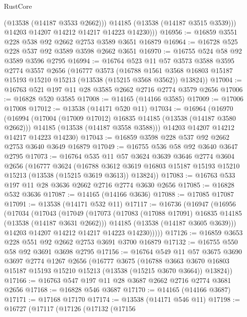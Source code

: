 \begin{lexlean}{RustCore}
\begin{coremodule}
              (@13538 (@14187 @3533 @2662)))
            @14185
            (@13538 (@14187 @3515 @3539)))
          @14203
          @14207
          @14212
          @14217
          @14223
          @14230)))
@16956 := @16859 @3551 @228 @538 @92 @2662 @2753 @3589 @3651 @16879
@16964 := @16728 @525 @228 @537 @92 @3589 @3598 @2662 @3651
@16970 := @16755 @524 @58 @92 @3589 @3596 @2795
@16994 := @16764
    @523
    @11
    @57
    @3573
    @3588
    @3595
    @2774
    @3557
    @2656
    (@16777
      @3573
      (@16788 @1561 @3568 @16803 @15187 @15193 @15210 @15213 (@13538 (@15215 @3568 @3562)) @13824))
@17004 := @16763 @521 @197 @11 @28 @3585 @2662 @2716 @2774 @3579 @2656
@17006 := @16828 @520 @3585
@17008 := @14165 (@14166 @3585)
@17009 := @17006 @17008
@17012 := @13538 (@14171 @520 @11)
@17034 := @16964
    (@16970
      (@16994
        (@17004 (@17009 @17012) @16835 @14185 (@13538 (@14187 @3580 @2662)))
        @14185
        (@13538 (@14187 @3558 @3588)))
      @14203
      @14207
      @14212
      @14217
      @14223
      @14230)
@17043 := @16859 @3598 @228 @537 @92 @2662 @2753 @3640 @3649 @16879
@17049 := @16755 @536 @58 @92 @3640 @3647 @2795
@17073 := @16764
    @535
    @11
    @57
    @3624
    @3639
    @3646
    @2774
    @3604
    @2656
    (@16777
      @3624
      (@16788 @3612 @3619 @16803 @15187 @15193 @15210 @15213 (@13538 (@15215 @3619 @3613)) @13824))
@17083 := @16763 @533 @197 @11 @28 @3636 @2662 @2716 @2774 @3630 @2656
@17085 := @16828 @532 @3636
@17087 := @14165 (@14166 @3636)
@17088 := @17085 @17087
@17091 := @13538 (@14171 @532 @11)
@17117 := @16736
    (@16947
      (@16956
        (@17034
          (@17043
            (@17049
              (@17073
                (@17083 (@17088 @17091) @16835 @14185 (@13538 (@14187 @3631 @2662)))
                @14185
                (@13538 (@14187 @3605 @3639)))
              @14203
              @14207
              @14212
              @14217
              @14223
              @14230)))))
@17126 := @16859 @3653 @228 @551 @92 @2662 @2753 @3691 @3700 @16879
@17132 := @16755 @550 @58 @92 @3691 @3698 @2795
@17156 := @16764
    @549
    @11
    @57
    @3675
    @3690
    @3697
    @2774
    @1267
    @2656
    (@16777
      @3675
      (@16788 @3663 @3670 @16803 @15187 @15193 @15210 @15213 (@13538 (@15215 @3670 @3664)) @13824))
@17166 := @16763 @547 @197 @11 @28 @3687 @2662 @2716 @2774 @3681 @2656
@17168 := @16828 @546 @3687
@17170 := @14165 (@14166 @3687)
@17171 := @17168 @17170
@17174 := @13538 (@14171 @546 @11)
@17198 := @16727
    (@17117
      (@17126
        (@17132
          (@17156

\end{coremodule}
\end{lexlean}
